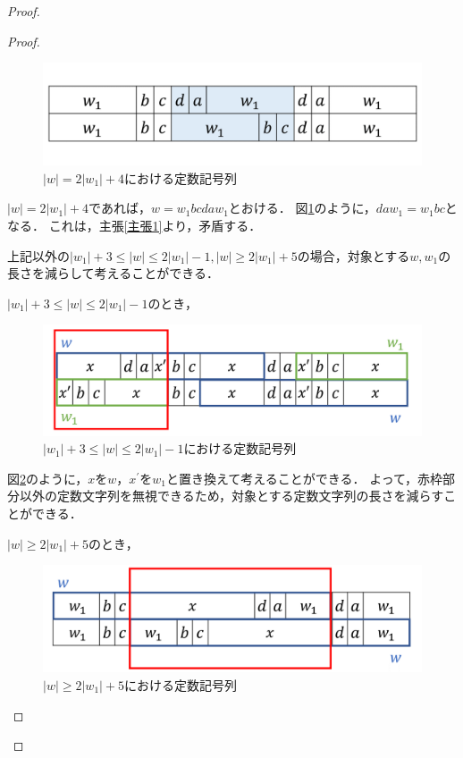 \begin{proof}
\begin{proof}
\begin{figure}[H]
\includegraphics[width=\linewidth]{画像/追加部分10.png}
\caption{$|w| = 2|w_{1}|+4$における定数記号列}
\label{追加部分10}
\end{figure}

$|w|=2|w_{1}|+4$であれば，$w=w_{1}bcdaw_{1}$とおける．
図\ref{追加部分10}のように，$daw_{1}=w_{1}bc$となる．
これは，主張\ref{主張1}より，矛盾する．

上記以外の$|w_{1}|+3 \le |w| \le 2|w_{1}|-1, |w| \ge 2|w_{1}|+5$の場合，対象とする$w,w_{1}$の長さを減らして考えることができる．

$|w_{1}|+3 \le |w| \le 2|w_{1}|-1$のとき，

\begin{figure}[H]
\includegraphics[width=\linewidth]{画像/w1+3.png}
\caption{\scriptsize $|w_{1}|+3 \le |w| \le 2|w_{1}|-1$における定数記号列}
\label{w1+3}
\end{figure}

図\ref{w1+3}のように，$x$を$w$，$x^{\prime}$を$w_{1}$と置き換えて考えることができる．
よって，赤枠部分以外の定数文字列を無視できるため，対象とする定数文字列の長さを減らすことができる．

$|w| \ge 2|w_{1}|+5$のとき，

\begin{figure}[H]
\includegraphics[width=\linewidth]{画像/2w1+5.png}
\caption{\scriptsize $|w| \ge 2|w_{1}|+5$における定数記号列}
\label{2w1+5}
\end{figure}


\end{proof}
\end{proof}
